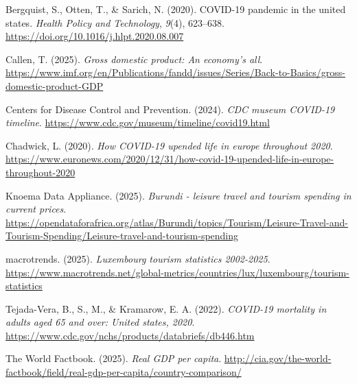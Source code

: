 \documentclass[
]{article}
\newlength{\cslhangindent}
\newenvironment{CSLReferences}[2] %
 {\begin{list}{}{%
  \setlength{\itemindent}{0pt}
  \setlength{\leftmargin}{0pt}
  \setlength{\parsep}{0pt}
  \ifodd #1
   \setlength{\leftmargin}{\cslhangindent}
   \setlength{\itemindent}{-1\cslhangindent}
  \fi
  \setlength{\itemsep}{#2\baselineskip}}}
 {\end{list}}
\begin{document}
\label{refs}
\begin{CSLReferences}{1}{0}
Bergquist, S., Otten, T., \& Sarich, N. (2020). COVID-19 pandemic in the
united states. \emph{Health Policy and Technology}, \emph{9}(4),
623--638. \url{https://doi.org/10.1016/j.hlpt.2020.08.007}

Callen, T. (2025). \emph{Gross domestic product: An economy's all}.
\url{https://www.imf.org/en/Publications/fandd/issues/Series/Back-to-Basics/gross-domestic-product-GDP}

Centers for Disease Control and Prevention. (2024). \emph{CDC museum
COVID-19 timeline}.
\url{https://www.cdc.gov/museum/timeline/covid19.html}

Chadwick, L. (2020). \emph{How COVID-19 upended life in europe
throughout 2020}.
\url{https://www.euronews.com/2020/12/31/how-covid-19-upended-life-in-europe-throughout-2020}

Knoema Data Appliance. (2025). \emph{Burundi - leisure travel and
tourism spending in current prices}.
\url{https://opendataforafrica.org/atlas/Burundi/topics/Tourism/Leisure-Travel-and-Tourism-Spending/Leisure-travel-and-tourism-spending}

macrotrends. (2025). \emph{Luxembourg tourism statistics 2002-2025}.
\url{https://www.macrotrends.net/global-metrics/countries/lux/luxembourg/tourism-statistics}

Tejada-Vera, B., S., M., \& Kramarow, E. A. (2022). \emph{COVID-19
mortality in adults aged 65 and over: United states, 2020}.
\url{https://www.cdc.gov/nchs/products/databriefs/db446.htm}

The World Factbook. (2025). \emph{Real GDP per capita}.
\url{http://cia.gov/the-world-factbook/field/real-gdp-per-capita/country-comparison/}

\end{CSLReferences}
\end{document}
